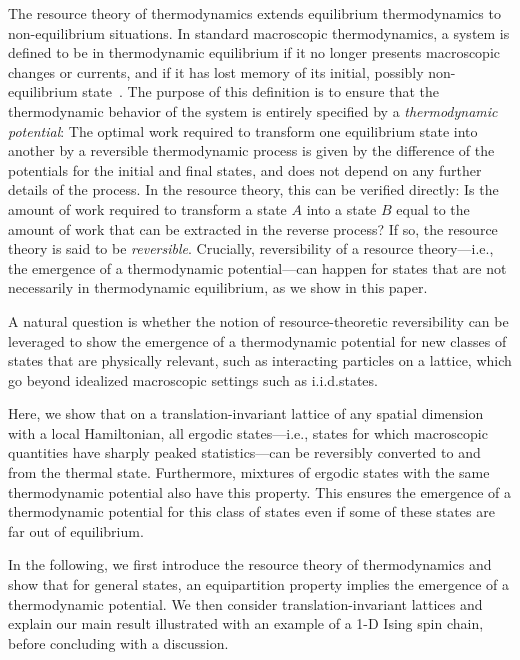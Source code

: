 \documentclass[prl,reprint,longbibliography,superscriptaddress]{revtex4-1}
\begin{document}
The resource theory of thermodynamics extends equilibrium thermodynamics to
non-equilibrium situations.
In standard macroscopic thermodynamics, a system is defined to be in
thermodynamic equilibrium if it no longer presents macroscopic changes or
currents, and if it has lost memory of its initial, possibly non-equilibrium
state~\cite{BookCallen_Thermo}.  The purpose of this definition is to ensure
that the thermodynamic behavior of the system is entirely specified by a
\emph{thermodynamic potential}: The optimal work required to transform one
equilibrium state into another by a reversible thermodynamic process is given by
the difference of the potentials for the initial and final states, and does not
depend on any further details of the process.
In the resource theory, this can be verified directly: Is the amount of work
required to transform a state $A$ into a state $B$ equal to the amount of work
that can be extracted in the reverse process?  If so, the resource theory is
said to be \emph{reversible}.  Crucially, reversibility of a resource
theory---i.e., the emergence of a thermodynamic potential---can happen for
states that are not necessarily in thermodynamic equilibrium, as we show in this
paper.

A natural question is whether the notion of resource-theoretic reversibility can
be leveraged to show the emergence of a thermodynamic potential for new classes
of states that are physically relevant, such as interacting particles on a
lattice, which go beyond idealized macroscopic settings such as i.i.d.\@ states.


Here, we show that on a translation-invariant lattice of any spatial dimension
with a local Hamiltonian, all ergodic states---i.e., states for which
macroscopic quantities have sharply peaked statistics---can be reversibly
converted to and from the thermal state.  Furthermore, mixtures of ergodic
states with the same thermodynamic potential also have this property.  This
ensures the emergence of a thermodynamic potential for this class of states even
if some of these states are far out of equilibrium.


In the following, we first introduce the resource theory of thermodynamics and
show that for general states, an equipartition property implies the emergence of
a thermodynamic potential.  We then consider translation-invariant lattices and
explain our main result illustrated with an example of a 1-D Ising spin chain,
before concluding with a discussion.
\end{document}
